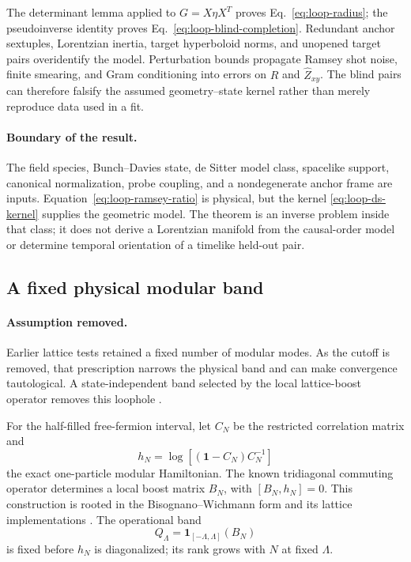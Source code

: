 The determinant lemma applied to
\(G=X\eta X^T\) proves Eq.~\eqref{eq:loop-radius}; the pseudoinverse identity
proves Eq.~\eqref{eq:loop-blind-completion}.  Redundant anchor sextuples,
Lorentzian inertia, target hyperboloid norms, and unopened target pairs
overidentify the model.  Perturbation bounds propagate Ramsey shot noise,
finite smearing, and Gram conditioning into errors on \(R\) and
\(\widehat Z_{xy}\).  The blind pairs can therefore falsify the assumed
geometry--state kernel rather than merely reproduce data used in a fit.

\paragraph{Boundary of the result.}
The field species, Bunch--Davies state, de Sitter model class, spacelike
support, canonical normalization, probe coupling, and a nondegenerate anchor
frame are inputs.  Equation~\eqref{eq:loop-ramsey-ratio} is physical, but the
kernel \eqref{eq:loop-ds-kernel} supplies the geometric model.  The theorem is
an inverse problem inside that class; it does not derive a Lorentzian
manifold from the causal-order model or determine temporal orientation of a
timelike held-out pair.

\subsection{A fixed physical modular band}
\label{sec:loop-modular}

\paragraph{Assumption removed.}
Earlier lattice tests retained a fixed number of modular modes.  As the
cutoff is removed, that prescription narrows the physical band and can make
convergence tautological.  A state-independent band selected by the local
lattice-boost operator removes this loophole
\cite{XuModular2026}.

For the half-filled free-fermion interval, let \(C_N\) be the restricted
correlation matrix and
\begin{equation}
 h_N=\log[(\mathbf1-C_N)C_N^{-1}]
 \label{eq:loop-modular-h}
\end{equation}
the exact one-particle modular Hamiltonian.  The known tridiagonal commuting
operator determines a local boost matrix \(B_N\), with
\([B_N,h_N]=0\).  This construction is rooted in the
Bisognano--Wichmann form and its lattice implementations
\cite{BisognanoWichmann1975,Giudici2018}.  The operational band
\begin{equation}
 Q_\Lambda=\mathbf1_{[-\Lambda,\Lambda]}(B_N)
 \label{eq:loop-modular-band}
\end{equation}
is fixed before \(h_N\) is diagonalized; its rank grows with \(N\) at fixed
\(\Lambda\).

